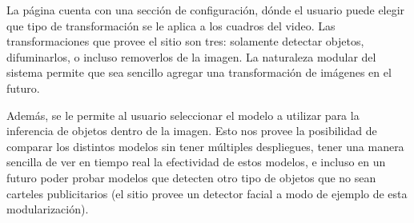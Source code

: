 \documentclass[a4paper]{article}
\begin{document}
La página cuenta con una sección de configuración, dónde el usuario puede elegir que tipo de transformación se le aplica a los cuadros del video. Las transformaciones que provee el sitio son tres: solamente detectar objetos, difuminarlos, o incluso removerlos de la imagen. La naturaleza modular del sistema permite que sea sencillo agregar una transformación de imágenes en el futuro.

\begin{figure}[H]
\end{figure}

Además, se le permite al usuario seleccionar el modelo a utilizar para la inferencia de objetos dentro de la imagen. Esto nos provee la posibilidad de comparar los distintos modelos sin tener múltiples despliegues, tener una manera sencilla de ver en tiempo real la efectividad de estos modelos, e incluso en un futuro poder probar modelos que detecten otro tipo de objetos que no sean carteles publicitarios (el sitio provee un detector facial a modo de ejemplo de esta modularización).
\end{document}
